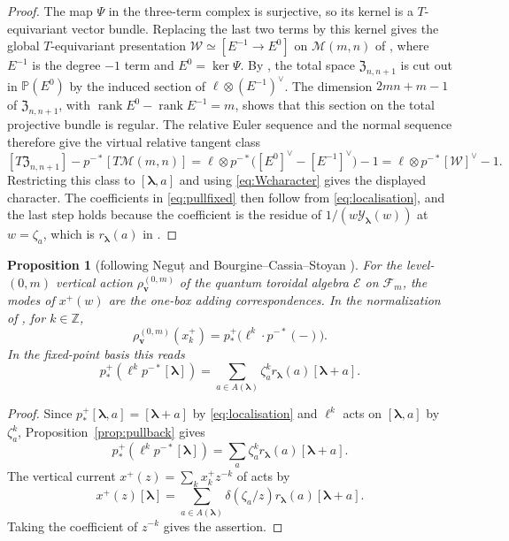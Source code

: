 \documentclass[11pt]{amsart}
\newtheorem{proposition}[theorem]{Proposition}
\theoremstyle{definition}
\theoremstyle{remark}
\newcommand{\bv}{{\mathbf v}}                    %
\newcommand{\bl}{{\boldsymbol{\lambda}}}         %
\newcommand{\Add}[1]{A(#1)}                      %
\newcommand{\bwt}[1]{\zeta_{#1}}                 %
\newcommand{\CY}{\mathcal Y}
\newcommand{\Yfn}[1]{\CY_{#1}}                   %
\newcommand{\res}[2]{r_{#1}(#2)}                 %
\newcommand{\Gies}[2]{\mathcal M(#1,#2)}         %
\newcommand{\Zc}{\mathfrak Z}
\newcommand{\Hecke}[1]{\Zc_{#1,#1+1}}            %
\newcommand{\Fock}[1]{\mathcal F_{#1}}            %
\newcommand{\Wc}{\mathcal W}                     %
\newcommand{\fix}[1]{[#1]}                       %
\newcommand{\pt}[2]{[#1,#2]}                     %
\newcommand{\taut}{\ell}                         %
\newcommand{\pulm}{p^{-*}}                       %
\newcommand{\pushp}{p^+_*}                       %
\newcommand{\xplus}[1]{x^+_{#1}}                 %
\newcommand{\rhov}{\rho^{(0,m)}_{\bv}}           %
\newcommand{\Negut}{Neguț}
\begin{document}
\begin{proof}
The map \(\Psi\) in the three-term complex \cite[(2.4)--(2.5)]{N1} is surjective, so its kernel
is a \(T\)-equivariant vector bundle. Replacing the last two terms by this kernel gives the
global \(T\)-equivariant presentation \(\Wc\simeq[E^{-1}\to E^0]\) on \(\Gies{m}{n}\)
of \cite[Section~2.4]{N1}, where \(E^{-1}\) is the degree \(-1\) term and \(E^0=\ker\Psi\).
By \cite[Proposition~2.19]{N2}, the total space \(\Hecke{n}\) is cut out in
\(\mathbb P(E^0)\) by the induced section of \(\taut\otimes(E^{-1})^\vee\).
The dimension \(2mn+m-1\) of \(\Hecke{n}\), with \(\operatorname{rank}E^0-\operatorname{rank}E^{-1}=m\),
shows that this section on the total projective bundle is regular.
The relative Euler sequence and the normal sequence therefore give the virtual relative tangent class
\[
 [T\Hecke{n}]-\pulm[T\Gies{m}{n}]
 =\taut\otimes\pulm\bigl([E^0]^\vee-[E^{-1}]^\vee\bigr)-1
 =\taut\otimes\pulm[\Wc]^\vee-1.
\]
Restricting this class to \(\pt{\bl}{a}\) and using \eqref{eq:Wcharacter} gives the displayed
character. The coefficients in \eqref{eq:pullfixed} then follow from \eqref{eq:localisation}, and the last
step holds because the coefficient is the residue of \(1/(w\Yfn{\bl}(w))\) at
\(w=\bwt{a}\), which is \(\res{\bl}{a}\) in \cite{BCS}.
\end{proof}

\begin{proposition}[{following \Negut{} \cite{N1} and Bourgine--Cassia--Stoyan \cite{BCS}}]\label{prop:vertical}
For the level-\((0,m)\) vertical action \(\rhov\) of the quantum toroidal algebra
\(\mathcal E\) on \(\Fock{m}\), the modes of \(x^+(w)\) are the one-box adding
correspondences. In the normalization of \cite{BCS}, for \(k\in\mathbb Z\),
\[
 \rhov(\xplus{k})=\pushp\bigl(\taut^k\cdot\pulm(-)\bigr).
\]
In the fixed-point basis this reads
\[
 \pushp(\taut^k\pulm\fix{\bl})
 =\sum_{a\in\Add{\bl}}\bwt{a}^k\res{\bl}{a}\fix{\bl+a}.
\]
\end{proposition}

\begin{proof}
Since \(\pushp\pt{\bl}{a}=\fix{\bl+a}\)
by \eqref{eq:localisation} and \(\taut^k\) acts on \(\pt{\bl}{a}\) by
\(\bwt{a}^k\), Proposition~\ref{prop:pullback} gives
\[
 \pushp(\taut^k\pulm\fix{\bl})=\sum_a\bwt{a}^k\res{\bl}{a}\fix{\bl+a}.
\]
The vertical current \(x^+(z)=\sum_k\xplus{k}z^{-k}\) of \cite[Section~2.2.1]{BCS} acts by
\[
 x^+(z)\fix{\bl}=\sum_{a\in\Add{\bl}}\delta(\bwt{a}/z)\res{\bl}{a}\fix{\bl+a}.
\]
Taking the coefficient of \(z^{-k}\) gives the assertion.
\end{proof}
\end{document}
